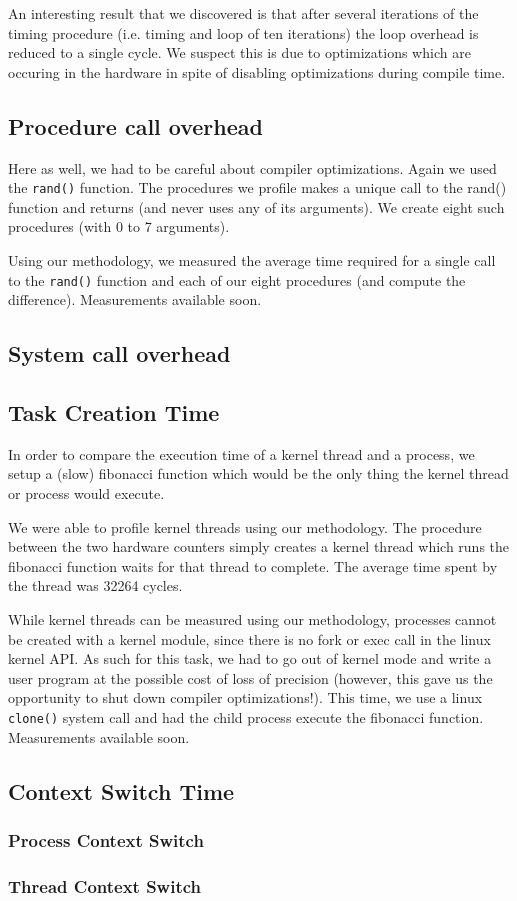 An interesting result that we discovered is that after several iterations of the
timing procedure (i.e. timing and loop of ten iterations) the loop overhead is
reduced to a single cycle. We suspect this is due to optimizations which are
occuring in the hardware in spite of disabling optimizations during compile
time.

\subsection{Procedure call overhead}

Here as well, we had to be careful about compiler optimizations. Again we used
the \texttt{rand()} function. The procedures we profile makes a unique call to
the rand() function and returns (and never uses any of its arguments). We create
eight such procedures (with 0 to 7 arguments).

Using our methodology, we measured the average time required for a single call
to the \texttt{rand()} function and each of our eight procedures (and compute
the difference). Measurements available soon.

\subsection{System call overhead}

\subsection{Task Creation Time}

In order to compare the execution time of a kernel thread and a process, we
setup a (slow) fibonacci function which would be the only thing the kernel
thread or process would execute.

We were able to profile kernel threads using our methodology. The procedure
between the two hardware counters simply creates a kernel thread which runs the
fibonacci function waits for that thread to complete. The average time spent by
the thread was 32264 cycles.

While kernel threads can be measured using our methodology, processes cannot be
created with a kernel module, since there is no fork or exec call in the linux
kernel API. As such for this task, we had to go out of kernel mode and write a
user program at the possible cost of loss of precision (however, this gave us
the opportunity to shut down compiler optimizations!). This time, we use a linux
\texttt{clone()} system call and had the child process execute the fibonacci
function. Measurements available soon.

\subsection{Context Switch Time} \subsubsection{Process Context Switch}
\subsubsection{Thread Context Switch}
